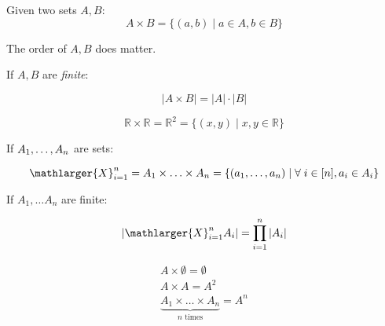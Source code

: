 \documentclass[00_complete]{subfiles}
\begin{document}
\begin{definition}
Given two sets $A,B$:
$$A \times B = \{(a,b) \mid a \in A, b \in B\}$$
\begin{note}
The order of $A, B$ does matter.
\end{note}
\end{definition}

If $A, B$ are \emph{finite}:

$$|A \times B| = |A| \cdot |B|$$

\begin{definition}[Plane]
$$\mathbb{R} \times \mathbb{R} = \mathbb{R}^2 = \{(x,y) \mid x, y \in \mathbb{R}\}$$
\end{definition}

If $A_1, \mathellipsis, A_n$ are sets:

$$\mathlarger{X}_{i=1}^{n} = A_1 \times \mathellipsis \times A_n = \{(a_1, \mathellipsis,
a_n) \mid \forall \; i \in [n], a_i \in A_i\}$$

If $A_1, \ldots A_n$ are finite:

$$\left|\mathlarger{X}_{i=1}^n A_i\right| = \prod_{i=1}^n |A_i|$$

\begin{definition}[Characteristics]
\begin{gather*}
    A \times \emptyset = \emptyset \\
    A \times A = A^2 \\
    \underbrace{A_1 \times \ldots \times A_n}_{n\text{ times}} = A^n
\end{gather*}
\end{definition}
\end{document}
